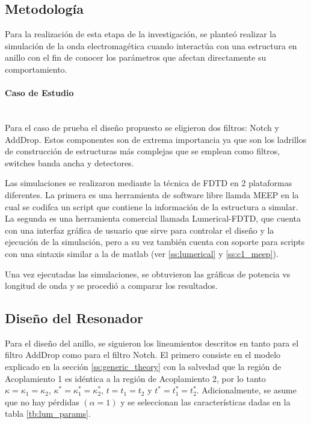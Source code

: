 \subsection{Metodología}
Para la realización de esta etapa de la investigación, se planteó realizar la simulación
de la onda electromagética cuando interactúa con una estructura en anillo con el fin de 
conocer los parámetros que afectan directamente su comportamiento.

\paragraph{Caso de Estudio} ~\\
Para el caso de prueba el diseño propuesto se eligieron dos filtros: Notch y AddDrop.
Estos componentes son de extrema importancia ya que son los ladrillos de construcción
de estructuras más complejas que se emplean como filtros, switches banda ancha y detectores.

Las simulaciones se realizaron mediante la técnica de FDTD en 2 plataformas diferentes. 
La primera es una herramienta de software libre llamda MEEP en la cual se codifca un 
script que contiene la información de la estructura a simular.
La segunda es una herramienta comercial llamada Lumerical-FDTD, que cuenta con una interfaz
gráfica de usuario que sirve para controlar el diseño y la ejecución de la simulación, pero
a su vez también cuenta con soporte para scripts con una sintaxis similar a la de matlab 
(ver \ref{ss:lumerical} y \ref{ss:c1_meep}).

Una vez ejecutadas las simulaciones, se obtuvieron las gráficas de potencia vs longitud de onda
y se procedió a comparar los resultados.

\subsection{Diseño del Resonador}
\label{sss:rr_design}


Para el diseño del anillo, se siguieron los lineamientos descritos en \cite{Lumerical2009}
tanto para el filtro AddDrop como para el filtro Notch. El primero consiste en
el modelo explicado en la sección \ref{ss:generic_theory} con la salvedad que 
la región de Acoplamiento 1 es idéntica a la región de Acoplamiento 2, por lo tanto
$\kappa = \kappa_1 = \kappa_2$, 
$\kappa^* = \kappa_1^* = \kappa_2^*$, 
$t=t_1 = t_2$ y 
$t^*=t_1^* = t_2^*$. 
Adicionalmente, se asume que no hay pérdidas $(\alpha=1)$ y
se seleccionan las características dadas en la tabla \ref{tb:lum_params}.

